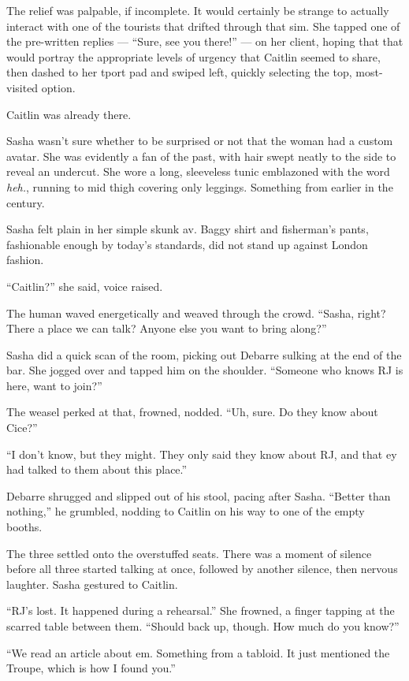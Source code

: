 The relief was palpable, if incomplete. It would certainly be strange to actually interact with one of the tourists that drifted through that sim. She tapped one of the pre-written replies — ``Sure, see you there!'' — on her client, hoping that that would portray the appropriate levels of urgency that Caitlin seemed to share, then dashed to her tport pad and swiped left, quickly selecting the top, most-visited option.

Caitlin was already there.

Sasha wasn't sure whether to be surprised or not that the woman had a custom avatar. She was evidently a fan of the past, with hair swept neatly to the side to reveal an undercut. She wore a long, sleeveless tunic emblazoned with the word \emph{heh.}, running to mid thigh covering only leggings. Something from earlier in the century.

Sasha felt plain in her simple skunk av. Baggy shirt and fisherman's pants, fashionable enough by today's standards, did not stand up against London fashion.

``Caitlin?'' she said, voice raised.

The human waved energetically and weaved through the crowd. ``Sasha, right? There a place we can talk? Anyone else you want to bring along?''

Sasha did a quick scan of the room, picking out Debarre sulking at the end of the bar. She jogged over and tapped him on the shoulder. ``Someone who knows RJ is here, want to join?''

The weasel perked at that, frowned, nodded. ``Uh, sure. Do they know about Cice?''

``I don't know, but they might. They only said they know about RJ, and that ey had talked to them about this place.''

Debarre shrugged and slipped out of his stool, pacing after Sasha. ``Better than nothing,'' he grumbled, nodding to Caitlin on his way to one of the empty booths.

The three settled onto the overstuffed seats. There was a moment of silence before all three started talking at once, followed by another silence, then nervous laughter. Sasha gestured to Caitlin.

``RJ's lost. It happened during a rehearsal.'' She frowned, a finger tapping at the scarred table between them. ``Should back up, though. How much do you know?''

``We read an article about em. Something from a tabloid. It just mentioned the Troupe, which is how I found you.''


